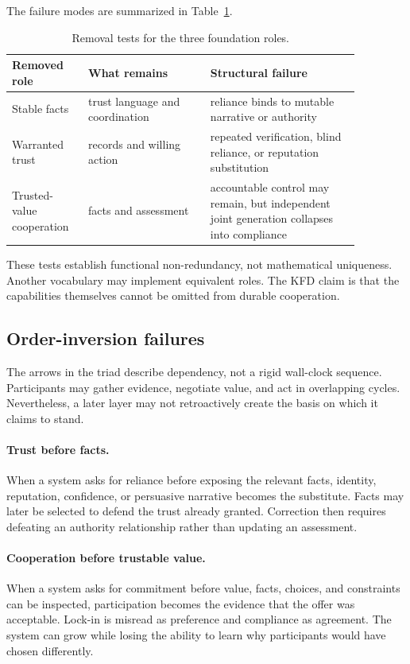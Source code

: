 The failure modes are summarized in Table~\ref{tab:removal}.

\begin{table}[ht]
\centering
\small
\begin{tabular}{p{0.18\linewidth}p{0.31\linewidth}p{0.38\linewidth}}
\toprule
Removed role & What remains & Structural failure \\
\midrule
Stable facts & trust language and coordination & reliance binds to mutable
narrative or authority \\
Warranted trust & records and willing action & repeated verification, blind
reliance, or reputation substitution \\
Trusted-value cooperation & facts and assessment & accountable control may
remain, but independent joint generation collapses into compliance \\
\bottomrule
\end{tabular}
\caption{Removal tests for the three foundation roles.}
\label{tab:removal}
\end{table}

These tests establish functional non-redundancy, not mathematical uniqueness.
Another vocabulary may implement equivalent roles. The KFD claim is that the
capabilities themselves cannot be omitted from durable cooperation.

\subsection{Order-inversion failures}

The arrows in the triad describe dependency, not a rigid wall-clock sequence.
Participants may gather evidence, negotiate value, and act in overlapping
cycles. Nevertheless, a later layer may not retroactively create the basis on
which it claims to stand.

\paragraph{Trust before facts.}
When a system asks for reliance before exposing the relevant facts, identity,
reputation, confidence, or persuasive narrative becomes the substitute. Facts
may later be selected to defend the trust already granted. Correction then
requires defeating an authority relationship rather than updating an
assessment.

\paragraph{Cooperation before trustable value.}
When a system asks for commitment before value, facts, choices, and
constraints can be inspected, participation becomes the evidence that the
offer was acceptable. Lock-in is misread as preference and compliance as
agreement. The system can grow while losing the ability to learn why
participants would have chosen differently.

